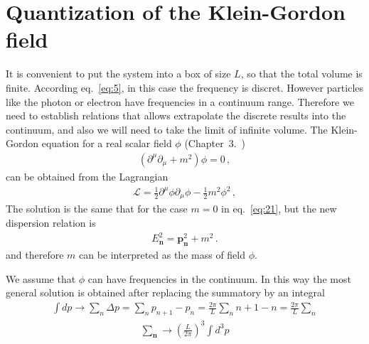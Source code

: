 \section{Quantization of the Klein-Gordon field}
\label{sec:quant-klein-gord}

It is convenient to put the system into a box of size $L$, so that the total volume is finite. According eq.~\eqref{eq:5}, in this case the frequency is discret. However particles like the photon or electron have frequencies in a continuum range. Therefore we need to establish relations that allows extrapolate the discrete results into the continuum, and also we will need to take the limit of  infinite volume. The Klein-Gordon equation for a real scalar field $\phi$ (Chapter~3.~\cite{lsm})
\begin{align}
  (\partial^\mu\partial_\mu+m^2)\phi=0\,,
\end{align}
can be obtained from the Lagrangian
\begin{align}
\label{eq:22}
  \mathcal{L}=\tfrac{1}{2}\partial^\mu\phi\partial_\mu\phi-\tfrac{1}{2}m^2\phi^2\,,
\end{align}
The solution is the same that for the case $m=0$ in eq.~\eqref{eq:21}, but 
the new dispersion relation is
\begin{align}
  E_{\mathbf{n}}^2=\mathbf{p}^2_{\mathbf{n}}+m^2\,.
\end{align}
and therefore $m$ can be interpreted as the mass of field $\phi$.

We assume that $\phi$ can have frequencies in the continuum. 
In this way the most general solution is obtained after replacing the summatory  by an integral
\begin{align}
  \int d p\to \sum_n \Delta p=\sum_n p_{n+1}-p_{n}=\frac{2\pi}{L}\sum_n n+1-n=\frac{2\pi}{L}\sum_n
\end{align}
\begin{align}
\label{eq:23}
 \sum_\mathbf{n} \to \left(\frac{L}{2\pi}\right)^3\int d^3p
\end{align}

